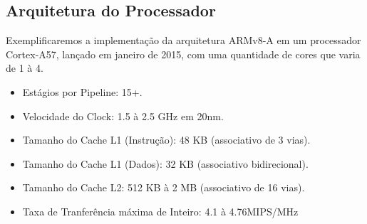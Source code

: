 \documentclass[12pt,a4paper,utf8]{ppgsi}
\begin{document}
    \subsection{Arquitetura do Processador}
        Exemplificaremos a implementação da arquitetura ARMv8-A em um processador Cortex-A57, lançado em janeiro de 2015, com uma quantidade de cores que varia de 1 à 4.
        \begin{itemize}
            \item Estágios por Pipeline: 15+.
        \end{itemize}
        \begin{itemize}
            \item Velocidade do Clock: 1.5 à 2.5 GHz em 20nm.
        \end{itemize}
        \begin{itemize}
            \item Tamanho do Cache L1 (Instrução): 48 KB (associativo de 3 vias).
        \end{itemize}
        \begin{itemize}
            \item Tamanho do Cache L1 (Dados): 32 KB (associativo bidirecional).
        \end{itemize}
        \begin{itemize}
            \item Tamanho do Cache L2: 512 KB à 2 MB (associativo de 16 vias).
        \end{itemize}
        \begin{itemize}
            \item Taxa de Tranferência máxima de Inteiro: 4.1 à 4.76MIPS/MHz
        \end{itemize}        
    


\nocite{manual}
\nocite{pressreal}
\nocite{pressarmv86}
\nocite{pressSdragon}
\nocite{bench}
\nocite{atomclose}
\end{document}
